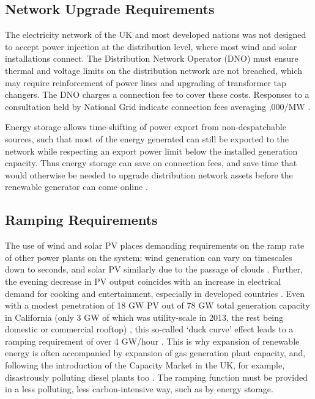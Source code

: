 \documentclass[report_18month.tex]{subfiles}
\begin{document}
\subsection{Network Upgrade Requirements}
\label{sec:Network Upgrade Requirements}
The electricity network of the UK and most developed nations was not designed to accept power injection at the distribution level, where most wind and solar installations connect. The Distribution Network Operator (DNO) must ensure thermal and voltage limits on the distribution network are not breached, which may require reinforcement of power lines and upgrading of transformer tap changers. \citep{glover2016power} The DNO charges a connection fee to cover these costs. Responses to a consultation held by National Grid indicate connection fees averaging ,000/MW \citep{natgrid2013consult}.

Energy storage allows time-shifting of power export from non-despatchable sources, such that most of the energy generated can still be exported to the network while respecting an export power limit below the installed generation capacity. Thus energy storage can save on connection fees, and save time that would otherwise be needed to upgrade distribution network assets before the renewable generator can come online \citep{howison2017sse}.

\subsection{Ramping Requirements}
The use of wind and solar PV places demanding requirements on the ramp rate of other power plants on the system: wind generation can vary on timescales down to seconds, and solar PV similarly due to the passage of clouds \citep{kirby2004frequency}. Further, the evening decrease in PV output coincides with an increase in electrical demand for cooking and entertainment, especially in developed countries \citep{kirby2004frequency}. Even with a modest penetration of 18 GW PV out of 78 GW total generation capacity in California (only 3 GW of which was utility-scale in 2013, the rest being domestic or commercial rooftop) \citep{cec2016california}, this so-called `duck curve' effect leads to a ramping requirement of over 4 GW/hour \citep{denholm2015duck}. This is why expansion of renewable energy is often accompanied by expansion of gas generation plant capacity, and, following the introduction of the Capacity Market in the UK, for example, disastrously polluting diesel plants too \citep{mattholie2017cm}. The ramping function must be provided in a less polluting, less carbon-intensive way, such as by energy storage.
\end{document}

